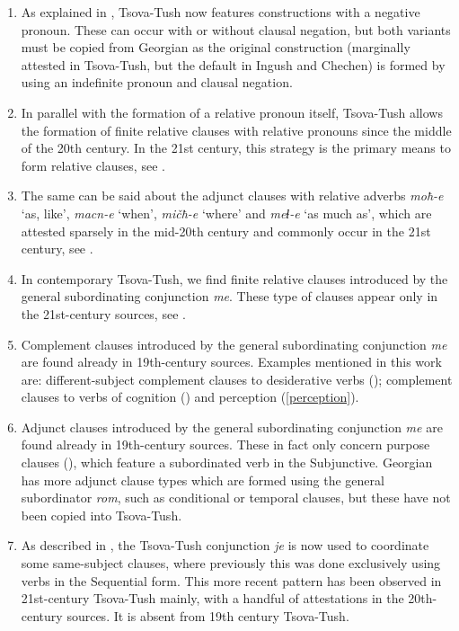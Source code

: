 \begin{enumerate}
	\item As explained in , Tsova-Tush now features constructions with a negative pronoun. These can occur with or without clausal negation, but both variants must be copied from Georgian as the original construction (marginally attested in Tsova-Tush, but the default in Ingush and Chechen) is formed by using an indefinite pronoun and clausal negation.
	
	\item In parallel with the formation of a relative pronoun itself, Tsova-Tush allows the formation of finite relative clauses with relative pronouns since the middle of the 20th century. In the 21st century, this strategy is the primary means to form relative clauses, see . 
	
	\item The same can be said about the adjunct clauses with relative adverbs \textit{moħ-e} `as, like', \textit{macn-e} `when', \textit{mičħ-e} `where' and \textit{meɬ-e} `as much as', which are attested sparsely in the mid-20th century and commonly occur in the 21st century, see .
	
	\item In contemporary Tsova-Tush, we find finite relative clauses introduced by the general subordinating conjunction \textit{me}. These type of clauses appear only in the 21st-century sources, see .
	
	\item Complement clauses introduced by the general subordinating conjunction \textit{me} are found already in 19th-century sources. Examples mentioned in this work are: different-subject complement clauses to desiderative verbs (); complement clauses to verbs of cognition () and perception (\ref{perception}).
	
	\item Adjunct clauses introduced by the general subordinating conjunction \textit{me} are found already in 19th-century sources. These in fact only concern purpose clauses (), which feature a subordinated verb in the Subjunctive. Georgian has more adjunct clause types which are formed using the general subordinator \textit{rom}, such as conditional or temporal clauses, but these have not been copied into Tsova-Tush.
	
	\item As described in , the Tsova-Tush conjunction \textit{je} is now used to coordinate some same-subject clauses, where previously this was done exclusively using verbs in the Sequential form. This more recent pattern has been observed in 21st-century Tsova-Tush mainly, with a handful of attestations in the 20th-century sources. It is absent from 19th century Tsova-Tush.
	
	
	
\end{enumerate}

